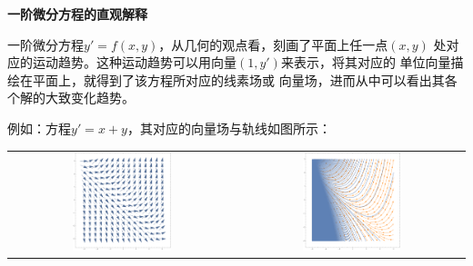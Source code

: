 \begin{shaded}
	{\bf 一阶微分方程的直观解释}
	
	一阶微分方程$y'=f(x,y)$，从几何的观点看，刻画了平面上任一点$(x,y)$
	处对应的运动趋势。这种运动趋势可以用向量$(1,y')$来表示，将其对应的
	单位向量描绘在平面上，就得到了该方程所对应的{\kaishu 线素场}或
	{\kaishu 向量场}，进而从中可以看出其各个解的大致变化趋势。
	
	例如：方程$y'=x+y$，其对应的向量场与轨线如图所示：
	\begin{center}
		\begin{tabular}{cc}
			\includegraphics[width=0.45\textwidth]{./images/ch7/dfxy-1.pdf}&
			\includegraphics[width=0.45\textwidth]{./images/ch7/dfxy-4.pdf}\\
		\end{tabular}
	\end{center}
	

\end{shaded}
